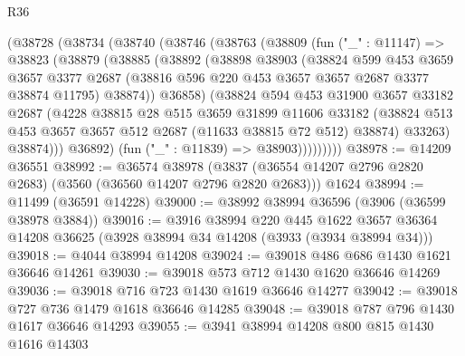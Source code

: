 \begin{lexlean}{R36}
\begin{coremodule}
        (@38728
          (@38734
            (@38740
              (@38746
                (@38763
                  (@38809
                    (fun ("_" : @11147) =>
                    @38823
                      (@38879
                        (@38885
                          (@38892
                            (@38898
                              @38903
                              (@38824
                                @599
                                @453
                                @3659
                                @3657
                                @3377
                                @2687
                                (@38816 @596 @220 @453 @3657 @3657 @2687 @3377 @38874 @11795)
                                @38874))
                            @36858)
                          (@38824
                            @594
                            @453
                            @31900
                            @3657
                            @33182
                            @2687
                            (@4228
                              @38815
                              @28
                              @515
                              @3659
                              @31899
                              @11606
                              @33182
                              (@38824
                                @513
                                @453
                                @3657
                                @3657
                                @512
                                @2687
                                (@11633 @38815 @72 @512)
                                @38874)
                              @33263)
                            @38874)))
                      @36892)
                    (fun ("_" : @11839) => @38903)))))))))
@38978 := @14209 @36551
@38992 := @36574
    @38978
    (@3837 (@36554 @14207 @2796 @2820 @2683) (@3560 (@36560 @14207 @2796 @2820 @2683)))
    @1624
@38994 := @11499 (@36591 @14228)
@39000 := @38992 @38994 @36596 (@3906 (@36599 @38978 @3884))
@39016 := @3916
    @38994
    @220
    @445
    @1622
    @3657
    @36364
    @14208
    @36625
    (@3928 @38994 @34 @14208 (@3933 (@3934 @38994 @34)))
@39018 := @4044 @38994 @14208
@39024 := @39018 @486 @686 @1430 @1621 @36646 @14261
@39030 := @39018 @573 @712 @1430 @1620 @36646 @14269
@39036 := @39018 @716 @723 @1430 @1619 @36646 @14277
@39042 := @39018 @727 @736 @1479 @1618 @36646 @14285
@39048 := @39018 @787 @796 @1430 @1617 @36646 @14293
@39055 := @3941 @38994 @14208 @800 @815 @1430 @1616 @14303

\end{coremodule}
\end{lexlean}
